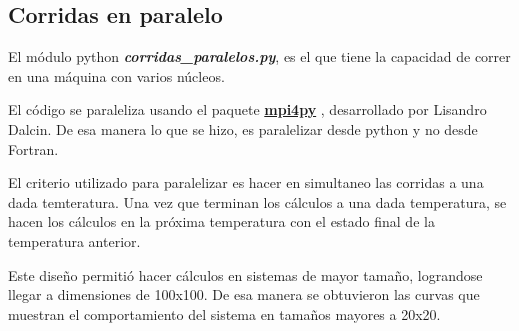 \subsection{Corridas en paralelo}\label{paralelo}

El módulo python \textbf{\textit{corridas\_paralelos.py}}, es el que tiene la capacidad de correr
en una máquina con varios núcleos.

El código se paraleliza usando el paquete \href{http://mpi4py.scipy.org/} {\textbf{mpi4py}} ,  desarrollado por Lisandro Dalcin.
De esa manera lo que se hizo, es paralelizar desde python y no desde Fortran.

El criterio utilizado para paralelizar es hacer en simultaneo  las corridas a una dada temteratura. 
Una vez que terminan los cálculos a una dada temperatura, se hacen los cálculos en la próxima
temperatura con el estado final de la temperatura anterior.

Este diseño permitió hacer cálculos en sistemas de mayor tamaño, lograndose llegar a dimensiones
de 100x100. De esa manera se obtuvieron las curvas que muestran el comportamiento del sistema en
tamaños mayores a 20x20.
